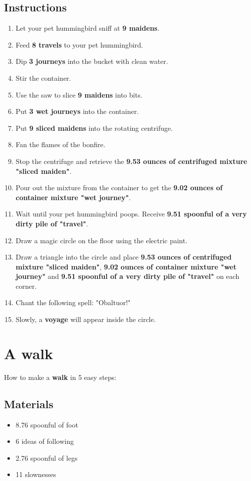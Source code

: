 \documentclass{article}
\begin{document}
\subsection{Instructions}\begin{enumerate}
\item 
Let your pet hummingbird sniff at \textbf{9 maidens}.
\item 
Feed \textbf{8 travels} to your pet hummingbird.
\item 
Dip \textbf{3 journeys} into the bucket with clean water.
\item 
Stir the container.
\item 
Use the saw to slice \textbf{9 maidens} into bits.
\item 
Put \textbf{3 wet journeys} into the container.
\item 
Put \textbf{9 sliced maidens} into the rotating centrifuge.
\item 
Fan the flames of the bonfire.
\item 
Stop the centrifuge and retrieve the \textbf{9.53 ounces of centrifuged mixture "sliced maiden"}.
\item 
Pour out the mixture from the container to get the \textbf{9.02 ounces of container mixture "wet journey"}.
\item 
Wait until your pet hummingbird poops. Receive \textbf{9.51 spoonful of a very dirty pile of "travel"}.
\item 
Draw a magic circle on the floor using the electric paint.
\item 
Draw a triangle into the circle and place \textbf{9.53 ounces of centrifuged mixture "sliced maiden"}, \textbf{9.02 ounces of container mixture "wet journey"} and \textbf{9.51 spoonful of a very dirty pile of "travel"} on each corner.
\item 
Chant the following spell: "Obaltuor!"
\item 
Slowly, a \textbf{voyage} will appear inside the circle.
\end{enumerate}
\newpage
\section{A walk}How to make a \textbf{walk} in 5 easy steps:

\subsection{Materials}\begin{itemize}
\item 
8.76 spoonful of foot
\item 
6 ideas of following
\item 
2.76 spoonful of legs
\item 
11 slownesses
\end{itemize}
\end{document}
